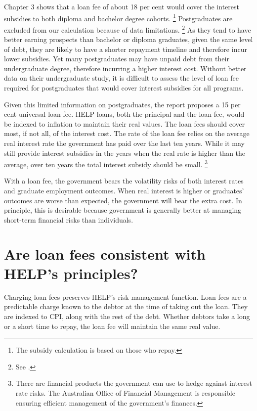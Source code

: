\documentclass[embargoed]{grattan}
\begin{document}
Chapter 3 shows that a loan fee of about 18 per cent would cover the interest subsidies to both diploma and bachelor degree cohorts.%
\footnote{The subsidy calculation is based on those who repay.} Postgraduates are excluded from our calculation because of data limitations.%
\footnote{See .} As they tend to have better earning prospects than bachelor or diploma graduates, given the same level of debt, they are likely to have a shorter repayment timeline and therefore incur lower subsidies.
Yet many postgraduates may have unpaid debt from their undergraduate degree, therefore incurring a higher interest cost.
Without better data on their undergraduate study, it is difficult to assess the level of loan fee required for postgraduates that would cover interest subsidies for all programs.

Given this limited information on postgraduates, the report proposes a 15 per cent universal loan fee.
\gls{HELP} loans, both the principal and the loan fee, would be indexed to inflation to maintain their real values.
The loan fees should cover most, if not all, of the interest cost.
The rate of the loan fee relies on the average real interest rate the government has paid over the last ten years.
While it may still provide interest subsidies in the years when the real rate is higher than the average, over ten years the total interest subsidy should be small.%
\footnote{There are financial products the government can use to hedge against interest rate risks.
The Australian Office of Financial Management is responsible ensuring efficient management of the government's finances.}

With a loan fee, the government bears the volatility risks of both interest rates and graduate employment outcomes.
When real interest is higher or graduates' outcomes are worse than expected, the government will bear the extra cost.
In principle, this is desirable because government is generally better at managing short-term financial risks than individuals.

\section[Are loan fees consistent with {HELP}'s principles?]{Are loan fees consistent with \gls{HELP}'s principles?}\label{are-loan-fees-consistent-with-helps-principles}

Charging loan fees preserves \gls{HELP}'s risk management function.
Loan fees are a predictable charge known to the debtor at the time of taking out the loan.
They are indexed to \gls{CPI}, along with the rest of the debt.
Whether debtors take a long or a short time to repay, the loan fee will maintain the same real value.
\end{document}
